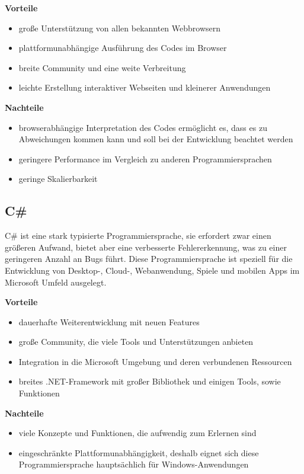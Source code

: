 \textbf{Vorteile}
\begin{itemize}
	\item große Unterstützung von allen bekannten Webbrowsern
	\item plattformunabhängige Ausführung des Codes im Browser
	\item breite Community und eine weite Verbreitung
	\item leichte Erstellung interaktiver Webseiten und kleinerer Anwendungen
\end{itemize}

\textbf{Nachteile}
\begin{itemize}
	\item browserabhängige Interpretation des Codes ermöglicht es, dass es zu Abweichungen kommen kann und soll bei der Entwicklung beachtet werden
	\item geringere Performance im Vergleich zu anderen Programmiersprachen
	\item geringe Skalierbarkeit
\end{itemize}

\subsection{C\#}
C\# ist eine stark typisierte Programmiersprache, sie erfordert zwar einen größeren Aufwand, bietet aber eine verbesserte Fehlererkennung, was zu einer geringeren Anzahl an Bugs führt. Diese Programmiersprache ist speziell für die Entwicklung von Desktop-, Cloud-, Webanwendung, Spiele und mobilen Apps im Microsoft Umfeld ausgelegt. \parencite{Programmiersprachen}

\textbf{Vorteile}
\begin{itemize}
	\item dauerhafte Weiterentwicklung mit neuen Features
	\item große Community, die viele Tools und Unterstützungen anbieten
	\item Integration in die Microsoft Umgebung und deren verbundenen Ressourcen
	\item breites .NET-Framework mit großer Bibliothek und einigen Tools, sowie Funktionen
\end{itemize}

\textbf{Nachteile}
\begin{itemize}
	\item viele Konzepte und Funktionen, die aufwendig zum Erlernen sind
	\item eingeschränkte Plattformunabhängigkeit, deshalb eignet sich diese Programmiersprache hauptsächlich für Windows-Anwendungen
\end{itemize}

